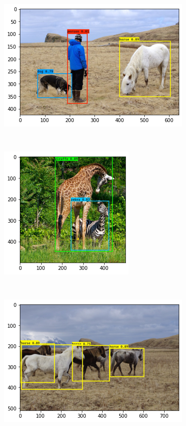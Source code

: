 \documentclass[11pt]{article}
\begin{document}
    \begin{center}
    \includegraphics{output_29_4}
    \end{center}
    { \hspace*{\fill} \\}
    
    \begin{center}
    \includegraphics{output_29_5}
    \end{center}
    { \hspace*{\fill} \\}
    
    \begin{center}
    \includegraphics{output_29_6}
    \end{center}
    { \hspace*{\fill} \\}
    
\end{document}
